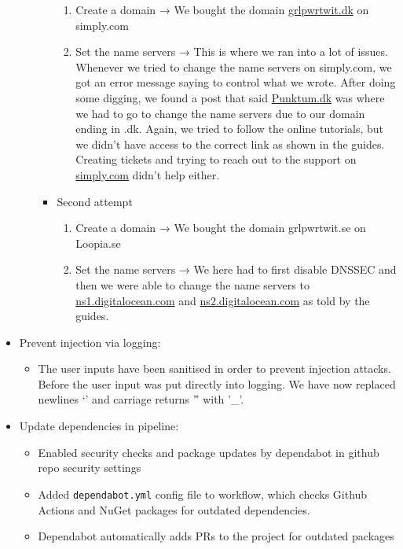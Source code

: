 \begin{itemize}
\begin{itemize}
\begin{itemize}
            \begin{enumerate}
                \item Create a domain → We bought the domain \href{http://grlpwrtwit.dk}{grlpwrtwit.dk} on simply.com
                \item Set the name servers → This is where we ran into a lot of issues. Whenever we tried to change the name servers on simply.com, we got an error message saying to control what we wrote. After doing some digging, we found a post that said \href{http://Punktum.dk}{Punktum.dk} was where we had to go to change the name servers due to our domain ending in .dk. Again, we tried to follow the online tutorials, but we didn't have access to the correct link as shown in the guides.
                Creating tickets and trying to reach out to the support on      \href{http://simply.com}{simply.com} didn't help either.
            \end{enumerate}
            \item Second attempt

            \begin{enumerate}
                \item Create a domain → We bought the domain grlpwrtwit.se on Loopia.se
                \item Set the name servers → We here had to first disable DNSSEC and then we were able to change the name servers to \href{http://ns1.digitalocean.com}{ns1.digitalocean.com} and \href{http://ns2.digitalocean.com}{ns2.digitalocean.com} as told by the guides.
            \end{enumerate}
        \end{itemize}
    \end{itemize}
    \item Prevent injection via logging:

    \begin{itemize}
        \item The user inputs have been sanitised in order to prevent injection attacks. Before the user input was put directly into logging. We have now replaced newlines `\n' and carriage returns '\r’ with '\_'.
    \end{itemize}
    \item Update dependencies in pipeline:

    \begin{itemize}
        \item Enabled security checks and package updates by dependabot in github repo security settings
        \item Added \texttt{dependabot.yml} config file to workflow, which checks Github Actions and NuGet packages for outdated dependencies.
        \item Dependabot automatically adds PRs to the project for outdated packages
    \end{itemize}
\end{itemize}
